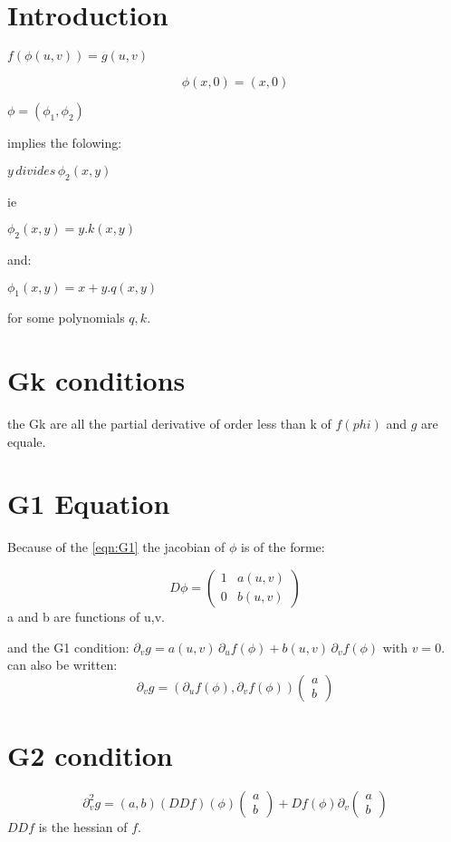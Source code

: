 \documentclass{article}
\begin{document}
\section{Introduction}
$f(\phi(u,v))=g(u,v)$

\begin{equation}
\label{eqn:G1}\phi(x,0)=(x,0)
\end{equation}

$\phi=(\phi_1,\phi_2)$

implies the folowing:

$y \,  divides \,\phi_2(x,y)$

ie

$\phi_2(x,y)=y.k(x,y)$

and:

$\phi_1(x,y)=x +y.q(x,y)$

for some polynomials $q,k$.

\section{Gk conditions}
the Gk are all the partial derivative of order less than k of $f(phi) $ and $g$ are equale.


\section{G1 Equation}

Because of the \ref{eqn:G1} the jacobian of $\phi$ is of the forme:

$$D\phi=
\begin{pmatrix}
1&a(u,v)\\
0 &b(u,v)
\end{pmatrix}
$$
a and b are functions of u,v.

and the G1 condition: $\partial _v g=a(u,v)\, \partial _u f (\phi)+b(u,v)\, \partial _v f (\phi)$  with $v=0$.
can also be written:
$$\partial _v g=(\partial _u f (\phi),\partial _v f (\phi)) \begin{pmatrix} a\\b\end{pmatrix}$$

\section{G2 condition}

$$\partial ^2_vg=(a,b)(DDf)(\phi)\begin{pmatrix} a\\b\end{pmatrix}+Df(\phi) \partial_v\begin{pmatrix} a\\b\end{pmatrix}$$
$DDf $ is the hessian of $f$.
\end{document}
